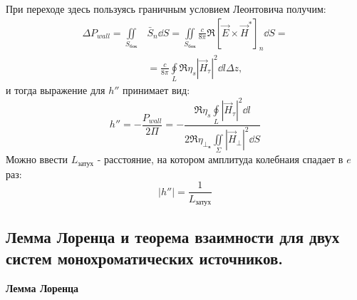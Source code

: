 При переходе здесь пользуясь граничным условием Леонтовича получим:
\begin{align*}
	\Delta P_{wall} = \iint \limits_{S_{\text{бок}}} &\bar{S}_n \dd S = \iint \limits_{S_{\text{бок}}} \frac{c}{8\pi} \Re{\left[\vec{E}\times\vec{H}^*\right]}_n\dd S =\\
	&  = \frac{c}{8\pi}\oint \limits_L \Re{\eta_s} |\vec{H}_{\tau}|^2 \dd l \Delta z,
\end{align*}
и тогда выражение для $h''$ принимает вид:
\begin{equation}
	h'' = -\frac{P_{wall}}{2 \Pi} = -\frac{\Re{\eta_s} \oint \limits_L  |\vec{H}_{\tau}|^2 \dd l}{2 \Re{\eta_{\perp_{\text{в}}}} \iint \limits_{\Sigma}|\vec{H}_{\perp}|^2 \dd S}	
\end{equation}
Можно ввести $L_{\text{затух}}$ - расстояние, на котором амплитуда колебнаия спадает в $e$ раз:
\begin{equation}
	|h''| = \frac{1}{L_{\text{затух}}}	
\end{equation}


\subsection{Лемма Лоренца и теорема взаимности для двух систем монохроматических источников.}
\textbf{Лемма Лоренца}

